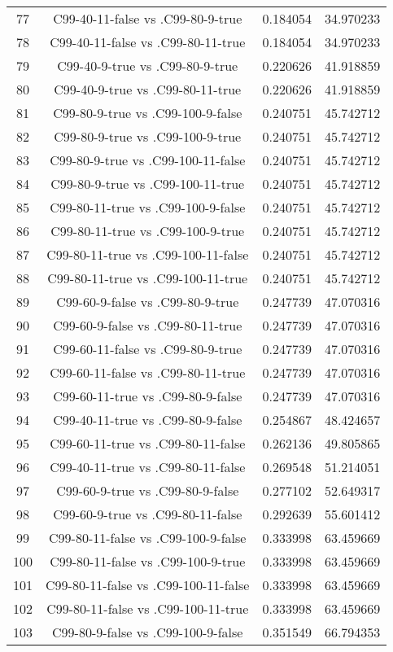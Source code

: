 \documentclass[a4paper,10pt]{article}
\begin{document}
\begin{landscape}
\begin{table}[!htp]
\begin{tabular}{cccc}
77&C99-40-11-false vs .C99-80-9-true&0.184054&34.970233\\
78&C99-40-11-false vs .C99-80-11-true&0.184054&34.970233\\
79&C99-40-9-true vs .C99-80-9-true&0.220626&41.918859\\
80&C99-40-9-true vs .C99-80-11-true&0.220626&41.918859\\
81&C99-80-9-true vs .C99-100-9-false&0.240751&45.742712\\
82&C99-80-9-true vs .C99-100-9-true&0.240751&45.742712\\
83&C99-80-9-true vs .C99-100-11-false&0.240751&45.742712\\
84&C99-80-9-true vs .C99-100-11-true&0.240751&45.742712\\
85&C99-80-11-true vs .C99-100-9-false&0.240751&45.742712\\
86&C99-80-11-true vs .C99-100-9-true&0.240751&45.742712\\
87&C99-80-11-true vs .C99-100-11-false&0.240751&45.742712\\
88&C99-80-11-true vs .C99-100-11-true&0.240751&45.742712\\
89&C99-60-9-false vs .C99-80-9-true&0.247739&47.070316\\
90&C99-60-9-false vs .C99-80-11-true&0.247739&47.070316\\
91&C99-60-11-false vs .C99-80-9-true&0.247739&47.070316\\
92&C99-60-11-false vs .C99-80-11-true&0.247739&47.070316\\
93&C99-60-11-true vs .C99-80-9-false&0.247739&47.070316\\
94&C99-40-11-true vs .C99-80-9-false&0.254867&48.424657\\
95&C99-60-11-true vs .C99-80-11-false&0.262136&49.805865\\
96&C99-40-11-true vs .C99-80-11-false&0.269548&51.214051\\
97&C99-60-9-true vs .C99-80-9-false&0.277102&52.649317\\
98&C99-60-9-true vs .C99-80-11-false&0.292639&55.601412\\
99&C99-80-11-false vs .C99-100-9-false&0.333998&63.459669\\
100&C99-80-11-false vs .C99-100-9-true&0.333998&63.459669\\
101&C99-80-11-false vs .C99-100-11-false&0.333998&63.459669\\
102&C99-80-11-false vs .C99-100-11-true&0.333998&63.459669\\
103&C99-80-9-false vs .C99-100-9-false&0.351549&66.794353\\

\end{tabular}
\end{table}
\end{landscape}
\end{document}
